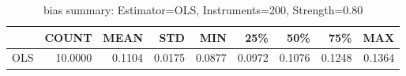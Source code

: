 \begin{table}[ht]
\centering
\caption{bias summary: Estimator=OLS, Instruments=200, Strength=0.80}
\begin{tabular}{lrrrrrrrr}
\toprule
 & COUNT & MEAN & STD & MIN & 25\% & 50\% & 75\% & MAX \\
\midrule
OLS & 10.0000 & 0.1104 & 0.0175 & 0.0877 & 0.0972 & 0.1076 & 0.1248 & 0.1364 \\
\bottomrule
\end{tabular}
\end{table}
